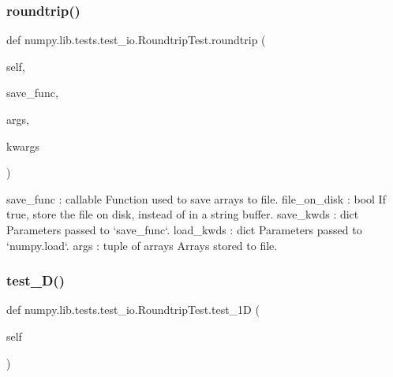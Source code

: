 \subsubsection{\texorpdfstring{roundtrip()}{roundtrip()}}
{\footnotesize\ttfamily def numpy.\+lib.\+tests.\+test\+\_\+io.\+Roundtrip\+Test.\+roundtrip (\begin{DoxyParamCaption}\item[{}]{self,  }\item[{}]{save\+\_\+func,  }\item[{}]{args,  }\item[{}]{kwargs }\end{DoxyParamCaption})}

\begin{DoxyVerb}save_func : callable
    Function used to save arrays to file.
file_on_disk : bool
    If true, store the file on disk, instead of in a
    string buffer.
save_kwds : dict
    Parameters passed to `save_func`.
load_kwds : dict
    Parameters passed to `numpy.load`.
args : tuple of arrays
    Arrays stored to file.\end{DoxyVerb}
 \mbox{\label{classnumpy_1_1lib_1_1tests_1_1test__io_1_1RoundtripTest_a0ccea7dbe8ae5a852d4729318c29752c}} 
\subsubsection{\texorpdfstring{test\+\_\+D()}{test\_1D()}}
{\footnotesize\ttfamily def numpy.\+lib.\+tests.\+test\+\_\+io.\+Roundtrip\+Test.\+test\+\_\+1D (\begin{DoxyParamCaption}\item[{}]{self }\end{DoxyParamCaption})}

\mbox{\label{classnumpy_1_1lib_1_1tests_1_1test__io_1_1RoundtripTest_ae35a7e862558852e62642b5c2f85c4a7}} 
